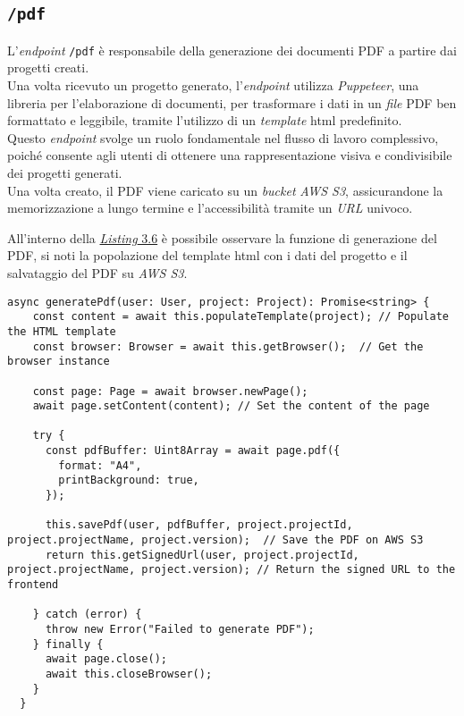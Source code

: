 \subsection*{\texttt{/pdf}}
L’\textit{endpoint} \texttt{/pdf} è responsabile della generazione dei documenti PDF a partire dai progetti creati.\\
Una volta ricevuto un progetto generato, l’\textit{endpoint} utilizza \textit{Puppeteer}, una libreria per l’elaborazione di documenti, per trasformare i dati in un \textit{file} PDF ben formattato e leggibile, tramite l'utilizzo di un \textit{template} \gls{html} predefinito.\\

Questo \textit{endpoint} svolge un ruolo fondamentale nel flusso di lavoro complessivo, poiché consente agli utenti di ottenere una rappresentazione visiva e condivisibile dei progetti generati.\\
Una volta creato, il PDF viene caricato su un \textit{bucket} \textit{AWS S3}, assicurandone la memorizzazione a lungo termine e l’accessibilità tramite un \textit{URL} univoco. 

\noindent All'interno della {\hyperref[lst:funzione-generazione-pdf]{\textit{Listing} 3.6}} è possibile osservare la funzione di generazione del PDF, si noti la popolazione del template \gls{html} con i dati del progetto e il salvataggio del PDF su \textit{AWS S3}.
\begin{lstlisting}[caption={Funzione di generazione del PDF, con salvataggio su \textit{AWS S3}}, label={lst:funzione-generazione-pdf}]
async generatePdf(user: User, project: Project): Promise<string> {
    const content = await this.populateTemplate(project); // Populate the HTML template
    const browser: Browser = await this.getBrowser();  // Get the browser instance

    const page: Page = await browser.newPage();
    await page.setContent(content); // Set the content of the page

    try {
      const pdfBuffer: Uint8Array = await page.pdf({
        format: "A4",
        printBackground: true,
      });

      this.savePdf(user, pdfBuffer, project.projectId, project.projectName, project.version);  // Save the PDF on AWS S3
      return this.getSignedUrl(user, project.projectId, project.projectName, project.version); // Return the signed URL to the frontend

    } catch (error) {
      throw new Error("Failed to generate PDF");
    } finally {
      await page.close();
      await this.closeBrowser();
    }
  }
\end{lstlisting}